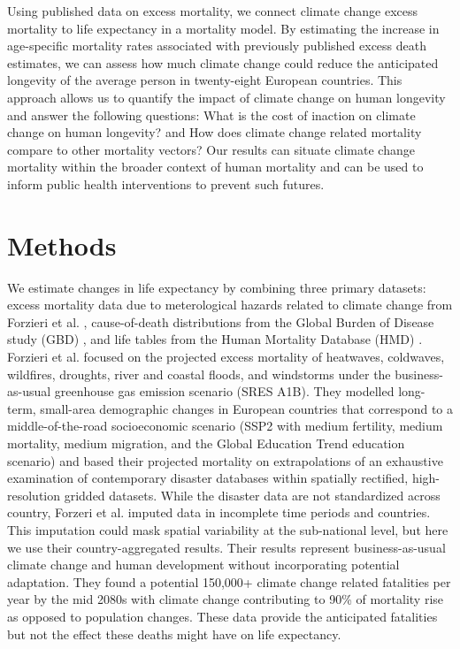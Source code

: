 \documentclass[12pt,]{article}
\begin{document}
Using published data on excess mortality\citep{forzieri2017increasing},
we connect climate change excess mortality to life expectancy in a
mortality model. By estimating the increase in age-specific mortality
rates associated with previously published excess death estimates, we
can assess how much climate change could reduce the anticipated
longevity of the average person in twenty-eight European countries. This
approach allows us to quantify the impact of climate change on human
longevity and answer the following questions: What is the cost of
inaction on climate change on human longevity? and How does climate
change related mortality compare to other mortality vectors? Our results
can situate climate change mortality within the broader context of human
mortality and can be used to inform public health interventions to
prevent such futures.

\section{Methods}\label{methods}

We estimate changes in life expectancy by combining three primary
datasets: excess mortality data due to meterological hazards related to
climate change from Forzieri et al. \citep{forzieri2017increasing},
cause-of-death distributions from the Global Burden of Disease study
(GBD) \citep{GBD, wang2012age}, and life tables from the Human Mortality
Database (HMD) \citep{HMD}. Forzieri et al.
\citep{forzieri2017increasing} focused on the projected excess mortality
of heatwaves, coldwaves, wildfires, droughts, river and coastal floods,
and windstorms under the business-as-usual greenhouse gas emission
scenario (SRES A1B). They modelled long-term, small-area demographic
changes in European countries that correspond to a middle-of-the-road
socioeconomic scenario (SSP2 with medium fertility, medium mortality,
medium migration, and the Global Education Trend education scenario) and
based their projected mortality on extrapolations of an exhaustive
examination of contemporary disaster databases within spatially
rectified, high-resolution gridded datasets. While the disaster data are
not standardized across country, Forzeri et al. imputed data in
incomplete time periods and countries. This imputation could mask
spatial variability at the sub-national level, but here we use their
country-aggregated results. Their results represent business-as-usual
climate change and human development without incorporating potential
adaptation. They found a potential 150,000+ climate change related
fatalities per year by the mid 2080s with climate change contributing to
90\% of mortality rise as opposed to population changes. These data
provide the anticipated fatalities but not the effect these deaths might
have on life expectancy.
\end{document}

